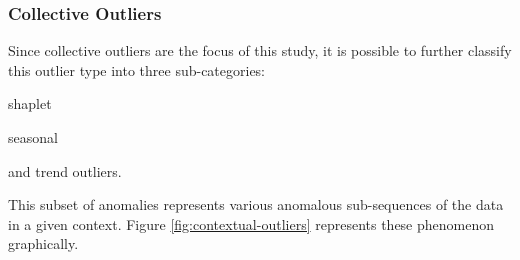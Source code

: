 \subsubsection{Collective Outliers}

Since collective outliers are the focus of this study, it is possible to further classify this outlier type into three sub-categories:
\begin{inlinelist}
    \item shaplet
    \item seasonal
    \item and trend outliers.
\end{inlinelist}
This subset of anomalies represents various anomalous sub-sequences of the data in a given context. Figure \ref{fig:contextual-outliers} represents these phenomenon graphically. 

